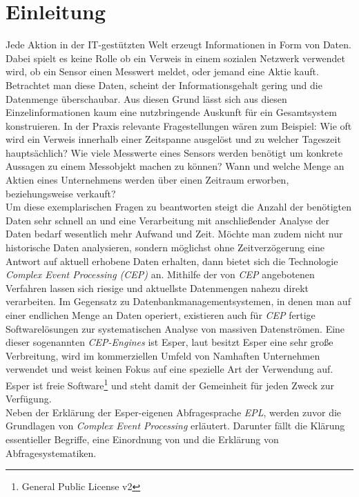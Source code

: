 \documentclass{acm_proc_article-sp}
\begin{document}
\section{Einleitung}
\vspace{0.1cm}
Jede Aktion in der IT-gestützten Welt erzeugt 
Informationen in Form von Daten. Dabei spielt es keine Rolle ob ein Verweis in einem 
sozialen Netzwerk verwendet wird, ob ein Sensor einen Messwert meldet, oder jemand eine 
Aktie kauft. Betrachtet man diese Daten, scheint der Informationsgehalt gering und die 
Datenmenge überschaubar. Aus diesen Grund lässt sich aus diesen Einzelinformationen kaum 
eine nutzbringende Auskunft für ein Gesamtsystem konstruieren. In der Praxis relevante
Fragestellungen wären zum Beispiel: Wie oft wird ein Verweis innerhalb einer Zeitspanne 
ausgelöst und zu welcher Tageszeit hauptsächlich? Wie viele Messwerte eines Sensors 
werden benötigt um konkrete Aussagen zu einem Messobjekt machen zu können? Wann und 
welche Menge an Aktien eines Unternehmens werden über einen Zeitraum erworben, 
beziehungsweise verkauft?\\
Um diese exemplarischen Fragen zu beantworten steigt die Anzahl der benötigten Daten sehr 
schnell an und eine Verarbeitung mit anschließender Analyse der Daten bedarf wesentlich 
mehr Aufwand und Zeit. Möchte man zudem nicht nur historische Daten analysieren, sondern 
möglichst ohne Zeitverzögerung eine Antwort auf aktuell erhobene Daten erhalten, dann 
bietet sich die Technologie \textit{Complex Event Processing (CEP)} an. Mithilfe der von 
\textit{CEP} angebotenen Verfahren lassen sich riesige und aktuellste Datenmengen nahezu 
direkt verarbeiten. Im Gegensatz zu Datenbankmanagementsystemen, in denen man auf einer 
endlichen Menge an Daten operiert, existieren auch für \textit{CEP} fertige 
Softwarelösungen zur systematischen Analyse von massiven Datenströmen. Eine dieser 
sogenannten \textit{CEP-Engines} ist Esper, laut \cite{fraunhofer} besitzt Esper eine 
sehr große Verbreitung, wird im kommerziellen Umfeld von Namhaften Unternehmen 
verwendet und weist keinen Fokus auf eine spezielle Art der Verwendung auf. Esper ist 
freie Software\footnote{General Public License v2} und steht damit der Gemeinheit für 
jeden 
Zweck zur Verfügung.\\
Neben der Erklärung der Esper-eigenen Abfragesprache \textit{EPL}, werden zuvor die 
Grundlagen von \textit{Complex Event Processing} erläutert. Darunter fällt die Klärung 
essentieller Begriffe, eine Einordnung von  und die Erklärung von 
Abfragesystematiken.
\end{document}
